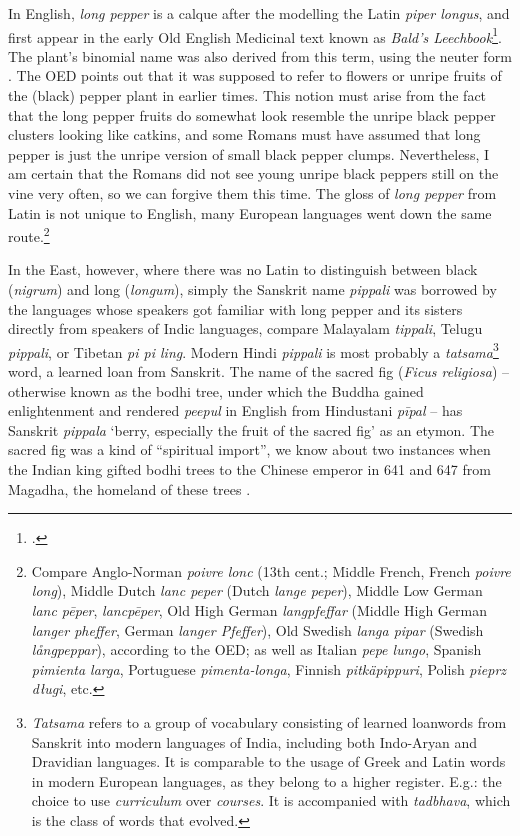 



In English, \textit{long pepper} is a calque after the modelling the Latin \textit{piper longus}, and first appear in the early Old English Medicinal text known as \textit{Bald's Leechbook}\footcite[longpepper]{oed}. The plant's binomial name was also derived from this term, using the neuter form . The \gls{OED} points out that it was supposed to refer to flowers or unripe fruits of the (black) pepper plant in earlier times. This notion must arise from the fact that the long pepper fruits do somewhat look resemble the unripe black pepper clusters looking like catkins, and some Romans must have assumed that long pepper is just the unripe version of small black pepper clumps. Nevertheless, I am certain that the Romans did not see young unripe black peppers still on the vine very often, so we can forgive them this time. The gloss of \textit{long pepper} from Latin is not unique to English, many European languages went down the same route.\footnote{Compare Anglo-Norman \textit{poivre lonc} (13th cent.; Middle French, French \textit{poivre long}), Middle Dutch \textit{lanc peper} (Dutch \textit{lange peper}), Middle Low German \textit{lanc pēper}, \textit{lancpēper}, Old High German \textit{langpfeffar} (Middle High German \textit{langer pheffer}, German \textit{langer Pfeffer}), Old Swedish \textit{langa pipar} (Swedish \textit{långpeppar}), according to the OED; as well as Italian \textit{pepe lungo}, Spanish \textit{pimienta larga}, Portuguese \textit{pimenta-longa}, Finnish \textit{pitkäpippuri}, Polish \textit{pieprz długi}, etc.} 

In the East, however, where there was no Latin to distinguish between black (\textit{nigrum}) and long (\textit{longum}), simply the Sanskrit name \textit{pippali} was borrowed by the languages whose speakers got familiar with long pepper and its sisters directly from speakers of Indic languages, compare Malayalam \textit{tippali}, Telugu \textit{pippali}, or Tibetan \textit{pi pi ling}. Modern Hindi \textit{pippali} is most probably a \textit{tatsama}\footnote{\textit{Tatsama} refers to a group of vocabulary consisting of learned loanwords from Sanskrit into modern languages of India, including both Indo-Aryan and Dravidian languages. It is comparable to the usage of Greek and Latin words in modern European languages, as they belong to a higher register. E.g.: the choice to use \textit{curriculum} over \textit{courses}. It is accompanied with  \textit{tadbhava}, which is the class of words that evolved.} word, a learned loan from Sanskrit. The name of the sacred fig (\textit{Ficus religiosa}) -- otherwise known as the bodhi tree, under which the Buddha gained enlightenment and rendered \textit{peepul} in English from Hindustani \textit{p\={i}pal} -- has Sanskrit \textit{pippala} `berry, especially the fruit of the sacred fig' as an etymon. The sacred fig was a kind of ``spiritual import'', we know about two instances when the Indian king gifted bodhi trees to the Chinese emperor in 641 and 647 from Magadha, the homeland of these trees \parencite[122]{schafer_golden_1985}.


